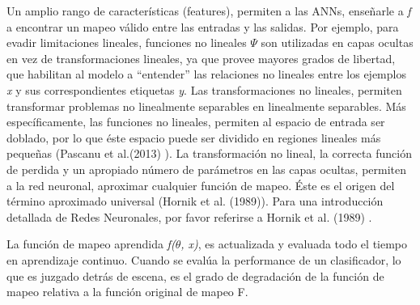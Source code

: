 Un amplio rango de características (features), permiten a las ANNs, enseñarle a \textit{f} a encontrar un mapeo válido entre las entradas y las salidas. Por ejemplo, para evadir limitaciones lineales, funciones no lineales $\Psi$ son utilizadas en capas ocultas en vez de transformaciones lineales, ya que provee mayores grados de libertad, que habilitan al modelo a ``entender'' las relaciones no lineales entre los ejemplos \textit{x} y sus correspondientes etiquetas \textit{y}. Las transformaciones no lineales, permiten transformar problemas no linealmente separables en linealmente separables. Más específicamente, las funciones no lineales, permiten al espacio de entrada ser doblado, por lo que éste espacio puede ser dividido en regiones lineales más pequeñas (Pascanu et al.(2013) \cite{pmlr-v28-pascanu13}). La transformación no lineal, la correcta función de perdida y un apropiado número de parámetros en las capas ocultas, permiten a la red neuronal, aproximar cualquier función de mapeo. Éste es el origen del término aproximado universal (Hornik et al. (1989)). Para una introducción detallada de Redes Neuronales, por favor referirse a Hornik et al. (1989) \cite{HORNIK1989359}.

La función de mapeo aprendida \textit{f($\theta$, x)}, es actualizada y evaluada todo el tiempo en aprendizaje continuo. Cuando se evalúa la performance de un clasificador, lo que es juzgado detrás de escena, es el grado de degradación de la función de mapeo relativa a la función original de mapeo F.
